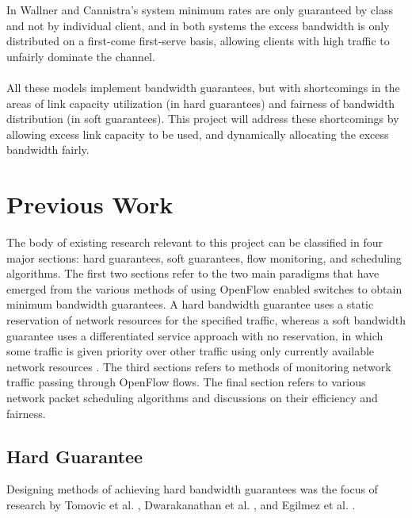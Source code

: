 \documentclass[accepted,single]{gipaper}
\begin{document}
In Wallner and Cannistra's \cite{Wallner:2013} system minimum rates are only guaranteed by class and not by individual client, and in both systems the excess bandwidth is only distributed on a first-come first-serve basis, allowing clients with high traffic to unfairly dominate the channel.
\\\\
All these models implement bandwidth guarantees, but with shortcomings in the areas of link capacity utilization (in hard guarantees) and fairness of bandwidth distribution (in soft guarantees). This project will address these shortcomings by allowing excess link capacity to be used, and dynamically allocating the excess bandwidth fairly.
\fi


\section{Previous Work}
\label{prev_work}

The body of existing research relevant to this project can be classified in four major sections: hard guarantees, soft guarantees, flow monitoring, and scheduling algorithms. The first two sections refer to the two main paradigms that have emerged from the various methods of using OpenFlow enabled switches to obtain minimum bandwidth guarantees. A hard bandwidth guarantee uses a static reservation of network resources for the specified traffic, whereas a soft bandwidth guarantee uses a differentiated service approach with no reservation, in which some traffic is given priority over other traffic using only currently available network resources \cite{softqos}. The third sections refers to methods of monitoring network traffic passing through OpenFlow flows. The final section refers to various network packet scheduling algorithms and discussions on their efficiency and fairness.

\subsection{Hard Guarantee}
\label{hard_qos}

Designing methods of achieving hard bandwidth guarantees was the focus of research by Tomovic et al. \cite{Tomovic:2014}, Dwarakanathan et al. \cite{Dwara:2015}, and Egilmez et al. \cite{Egil}.
\\
\end{document}
